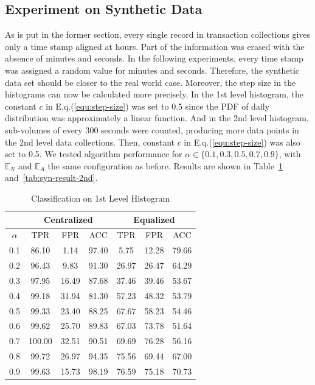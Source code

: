 \documentclass[10pt,conference,letterpaper]{IEEEtran}
\begin{document}
		\subsection{Experiment on Synthetic Data}\label{sec:exp-synthetic}
			As is put in the former section, every single record in transaction collections gives only a time stamp aligned at hours. Part of the information was erased with the absence of minutes and seconds. In the following experiments, every time stamp was assigned a random value for minutes and seconds. Therefore, the synthetic data set should be closer to the real world case. Moreover, the step size in the histograms can now be calculated more precisely. In the 1st level histogram, the constant $c$ in E.q.(\ref{equ:step-size}) was set to 0.5 since the PDF of daily distribution was approximately a linear function. And in the 2nd level histogram, sub-volumes of every 300 seconds were counted, producing more data points in the 2nd level data collections. Then, constant $c$ in E.q.(\ref{equ:step-size}) was also set to 0.5.
			We tested algorithm performance for $\alpha \in \{0.1, 0.3, 0.5, 0.7, 0.9\}$, with $\mathbb{E}_N$ and $\mathbb{E}_A$ the same configuration as before. Results are shown in Table~\ref{tab:syn-result-1st} and~\ref{tab:syn-result-2nd}.
			
			\begin{table}[!ht]
				\centering
				\caption{Classification on 1st Level Histogram}
				\label{tab:syn-result-1st}
				\begin{tabular}{|c|c|c|c|c|c|c|}
					\hline
					& \multicolumn{3}{c|}{Centralized} & \multicolumn{3}{c|}{Equalized}\\
					\hline
					$\alpha$ & TPR & FPR & ACC & TPR & FPR & ACC \\ 
					\hline
					0.1 & 86.10 & 1.14 & 97.40 & 5.75 & 12.28 & 79.66 \\ 
					\hline
					0.2 & 96.43 & 9.83 & 91.30 & 26.97 & 26.47 & 64.29 \\ 
					\hline
					0.3 & 97.95 & 16.49 & 87.68 & 37.46 & 39.46 & 53.67 \\ 
					\hline
					0.4 & 99.18 & 31.94 & 81.30 & 57.23 & 48.32 & 53.79 \\ 
					\hline
					0.5 & 99.33 & 23.40 & 88.25 & 67.67 & 58.23 & 54.46 \\ 
					\hline
					0.6 & 99.62 & 25.70 & 89.83 & 67.03 & 73.78 & 51.64 \\ 
					\hline
					0.7 & 100.00 & 32.51 & 90.51 & 69.69 & 76.28 & 56.16 \\ 
					\hline
					0.8 & 99.72 & 26.97 & 94.35 & 75.56 & 69.44 & 67.00 \\ 
					\hline
					0.9 & 99.63 & 15.73 & 98.19 & 76.59 & 75.18 & 70.73\\
					\hline
				\end{tabular} 
			\end{table}
			
\end{document}
